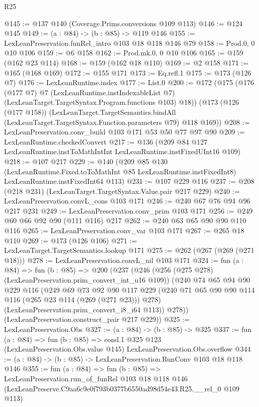 \begin{lexlean}{R25}
\begin{coremodule}
@145 := @137 @140 (Coverage.Prims.conversions @109 @113)
@146 := @124 @145
@149 := (a : @84) -> (b : @85) -> @119 @146
@155 := LexLeanPreservation.funRel_intro @103 @18 @118 @146 @79
@158 := Prod.{0, 0} @10 @106
@159 := @6 @158
@162 := Prod.mk.{0, 0} @10 @106
@165 := @159 (@162 @23 @114)
@168 := @159 (@162 @18 @110)
@169 := @2 @158
@171 := @165 (@168 @169)
@172 := @155 @171
@173 := Eq.refl.{1}
@175 := @173 (@126 @7)
@176 := LexLeanRuntime.index
@177 := List.{0}
@200 := @172
    (@175
      (@176
        (@177 @7)
        @7
        (LexLeanRuntime.instIndexableList @7)
        (LexLeanTarget.TargetSyntax.Program.functions @103)
        @18))
    (@173
      (@126 (@177 @158))
      (LexLeanTarget.TargetSemantics.bindAll
        (LexLeanTarget.TargetSyntax.Function.parameters @79)
        @118
        @169))
@208 := LexLeanPreservation.conv_build @103 @171 @53 @50 @77 @97 @90
@209 := LexLeanRuntime.checkedConvert
@217 := @136 (@209 @84 @127 LexLeanRuntime.instToMathIntInt LexLeanRuntime.instFixedUInt16 @109)
@218 := @107 @217
@229 := @140
    (@209
      @85
      @130
      (LexLeanRuntime.Fixed.toToMathInt @85 LexLeanRuntime.instFixedInt8)
      LexLeanRuntime.instFixedInt64
      @113)
@231 := @107 @229 @116
@237 := @208 (@218 @231) (LexLeanTarget.TargetSyntax.Value.pair @217 @229)
@240 := LexLeanPreservation.convL_cons @103 @171
@246 := @240 @67 @76 @94 @96 @217 @231
@249 := LexLeanPreservation.conv_prim @103 @171
@256 := @249 @60 @66 @92 @90 (@111 @116) @217
@262 := @240 @63 @65 @90 @90 @110 @116
@265 := LexLeanPreservation.conv_var @103 @171
@267 := @265 @18 @110
@269 := @173 (@126 @106)
@271 := LexLeanTarget.TargetSemantics.lookup @171
@275 := @262 (@267 (@269 (@271 @18)))
@278 := LexLeanPreservation.convL_nil @103 @171
@324 := fun (a : @84) =>
  fun (b : @85) =>
  @200
    (@237
      (@246
        (@256 (@275 @278) (LexLeanPreservation.prim_convert_int_u16 @109))
        (@240
          @74
          @65
          @94
          @90
          @229
          @116
          (@249
            @69
            @73
            @92
            @90
            @117
            @229
            (@240 @71 @65 @90 @90 @114 @116 (@265 @23 @114 (@269 (@271 @23))) @278)
            (LexLeanPreservation.prim_convert_i8_i64 @113))
          @278))
      (LexLeanPreservation.construct_pair @217 @229))
@325 := LexLeanPreservation.Obs
@327 := (a : @84) -> (b : @85) -> @325
@337 := fun (a : @84) =>
  fun (b : @85) =>
  cond.{1} @325 @123 (LexLeanPreservation.Obs.value @145) LexLeanPreservation.Obs.overflow
@344 := (a : @84) -> (b : @85) -> LexLeanPreservation.RunConv @103 @18 @118 @146
@355 := fun (a : @84) =>
  fun (b : @85) =>
  LexLeanPreservation.run_of_funRel
    @103
    @18
    @118
    @146
    (LexLeanPreserve.C9aa6c9e0f793b0377b6550ad98d54e43.R25.__rel_0 @109 @113)
\end{coremodule}
\end{lexlean}
